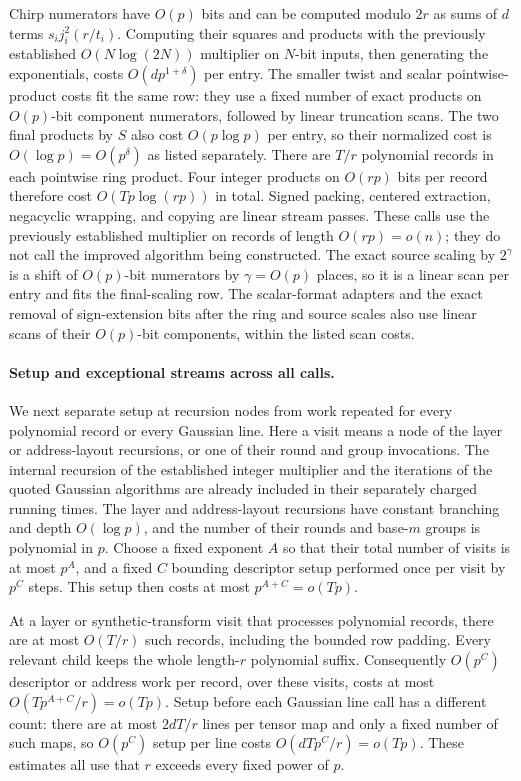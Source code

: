 Chirp numerators have $O(p)$ bits and can be computed modulo $2r$ as
sums of $d$ terms $s_i j_i^2(r/t_i)$.  Computing their squares and
products with the previously established $O(N\log(2N))$ multiplier
on $N$-bit inputs,
then generating the exponentials, costs $O(dp^{1+\delta})$ per entry.
The smaller twist and scalar pointwise-product costs fit the same row:
they use a fixed number of exact products on $O(p)$-bit component
numerators, followed by linear truncation scans.  The two final products
by $S$ also cost $O(p\log p)$ per entry, so their normalized cost is
$O(\log p)=O(p^\delta)$ as listed separately.  There are $T/r$
polynomial records in each pointwise ring product.  Four integer
products on $O(rp)$ bits per record therefore cost
$O(Tp\log(rp))$ in total.  Signed packing, centered extraction,
negacyclic wrapping, and copying are linear stream passes.  These calls
use the previously established multiplier on records of length
$O(rp)=o(n)$; they do not call the improved algorithm being constructed.
The exact source scaling by $2^\gamma$ is a shift of $O(p)$-bit
numerators by $\gamma=O(p)$ places, so it is a linear scan per entry
and fits the final-scaling row. The scalar-format adapters and the exact
removal of sign-extension bits after the ring and source scales also use
linear scans of their $O(p)$-bit components, within the listed scan costs.

\paragraph{Setup and exceptional streams across all calls.}
We next separate setup at recursion nodes from work repeated for every
polynomial record or every Gaussian line.  Here a visit means a node
of the layer or address-layout recursions, or one of their round and
group invocations.  The internal recursion of the established integer
multiplier and the iterations of the quoted Gaussian algorithms are
already included in their separately charged running times.
The layer and address-layout recursions have constant branching and
depth $O(\log p)$, and the number of their rounds and base-$m$ groups
is polynomial in $p$.  Choose a fixed exponent $A$ so that their
total number of visits is at most $p^A$, and a fixed $C$ bounding
descriptor setup performed once per visit by $p^C$ steps.  This setup then
costs at most $p^{A+C}=o(Tp)$.

At a layer or synthetic-transform visit that processes polynomial
records, there are at most $O(T/r)$ such records, including the
bounded row padding.  Every relevant child keeps the whole
length-$r$ polynomial suffix.  Consequently $O(p^C)$ descriptor or
address work per record, over these visits, costs at most
$O(Tp^{A+C}/r)=o(Tp)$.  Setup before each Gaussian line call has a
different count:
there are at most $2dT/r$ lines per tensor map and only a fixed number
of such maps, so $O(p^C)$ setup per line costs
$O(dTp^C/r)=o(Tp)$.  These estimates all use that $r$ exceeds every
fixed power of $p$.

